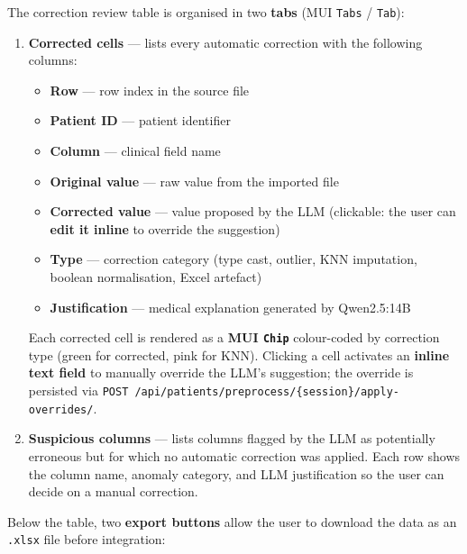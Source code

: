\documentclass[12pt,a4paper,twoside]{report}
\begin{document}
\begin{description}
The correction review table is organised in two \textbf{tabs} (MUI \texttt{Tabs} / \texttt{Tab}):

\begin{enumerate}
  \item \textbf{Corrected cells} — lists every automatic correction with the following columns:
    \begin{itemize}
      \item \textbf{Row} — row index in the source file
      \item \textbf{Patient ID} — patient identifier
      \item \textbf{Column} — clinical field name
      \item \textbf{Original value} — raw value from the imported file
      \item \textbf{Corrected value} — value proposed by the LLM (clickable: the user can \textbf{edit it inline} to override the suggestion)
      \item \textbf{Type} — correction category (type cast, outlier, KNN imputation, boolean normalisation, Excel artefact)
      \item \textbf{Justification} — medical explanation generated by Qwen2.5:14B
    \end{itemize}
    Each corrected cell is rendered as a \textbf{MUI \texttt{Chip}} colour-coded by correction type (green for corrected, pink for KNN). Clicking a cell activates an \textbf{inline text field} to manually override the LLM's suggestion; the override is persisted via \texttt{POST /api/patients/preprocess/\{session\}/apply-overrides/}.

  \item \textbf{Suspicious columns} — lists columns flagged by the LLM as potentially erroneous but for which no automatic correction was applied. Each row shows the column name, anomaly category, and LLM justification so the user can decide on a manual correction.
\end{enumerate}

Below the table, two \textbf{export buttons} allow the user to download the data as an \texttt{.xlsx} file before integration:


\end{description}
\end{document}
